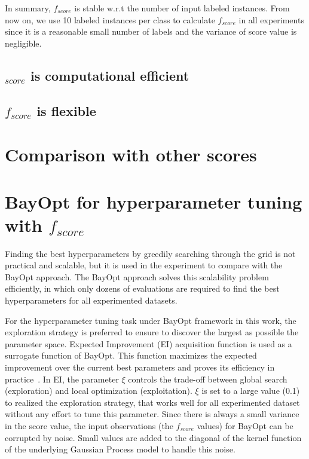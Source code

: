 In summary, $f_{score}$ is stable w.r.t the number of input labeled instances.
From now on, we use 10 labeled instances per class to calculate $f_{score}$ in all experiments since it is a reasonable small number of labels and the variance of score value is negligible.

\subsection{$_{score}$ is computational efficient}\label{sec:efficiency}

\subsection{$f_{score}$ is flexible}\label{sec:flexibility}



\section{Comparison with other scores}\label{sec:compare}


\section{BayOpt for hyperparameter tuning with $f_{score}$}\label{sec:apply-bayopt}

Finding the best hyperparameters by greedily searching through the grid is not practical and scalable, but it is used in the experiment to compare with the BayOpt approach.
The BayOpt approach solves this scalability problem efficiently, in which only dozens of evaluations are required to find the best hyperparameters for all experimented datasets.

For the hyperparameter tuning task under BayOpt framework in this work, the exploration strategy is preferred to ensure to discover the largest as possible the parameter space.
Expected Improvement (EI) acquisition function is used as a surrogate function of BayOpt.
This function maximizes the expected improvement over the current best parameters and proves its efficiency in practice~\cite{snoek2012practical}.
In EI, the parameter $\xi$ controls the trade-off between global search (exploration) and local optimization (exploitation).
$\xi$ is set to a large value (0.1) to realized the exploration strategy, that works well for all experimented dataset without any effort to tune this parameter.
Since there is always a small variance in the score value, 
the input observations (the $f_{score}$ values) for BayOpt can be corrupted by noise.
Small values are added to the diagonal of the kernel function of the underlying Gaussian Process model to handle this noise.


